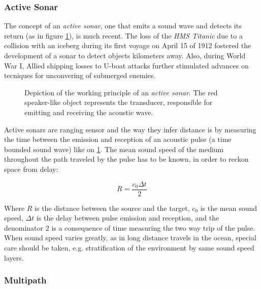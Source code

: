 \subsubsection{Active Sonar}

The concept of an \textit{active sonar}, one that emits a sound wave and detects
its return (as in figure \ref{fig:sonar_principle}), is much recent. The
loss of the \textit{HMS Titanic} due to a collision with an iceberg during its
first voyage on April 15 of 1912 \cite{histsonar} fostered the development of a sonar
to detect objects kilometers away. Also, during World War I,
Allied shipping losses to U-boat attacks further stimulated advances on tecniques for
unconvering of submerged enemies.

\begin{figure}
	\centering
	
	\caption{Depiction of the working principle of an \textit{active sonar}. The
	red speaker-like object represents the transducer, responsible for
	emitting and receiving the acoustic wave.}
	\label{fig:sonar_principle}
\end{figure}

Active sonars are ranging sensor and the way they infer distance is by measuring
the time between the emission and reception of an acoustic pulse (a time bounded
sound wave) like on \ref{fig:sonar_principle}. The mean sound speed of the
medium throughout the path traveled by the pulse has to be known,
in order to reckon space from delay\cite{LURTON}:

\begin{equation}
R = \frac{c_0 \Delta t}{2}
\label{eq:delaytodistance}
\end{equation}


Where $R$ is the distance between the source and the target, $c_0$ is the mean
sound speed, $\Delta t$ is the delay between pulse emission and reception, and
the denominator $2$ is a consequence of time measuring the two way
trip of the pulse. When sound speed varies greatly, as in long distance travels in
the ocean, special care should be taken\cite{Etter2013}, e.g. stratification of
the environment by same sound speed layers.



\subsubsection{Multipath}

